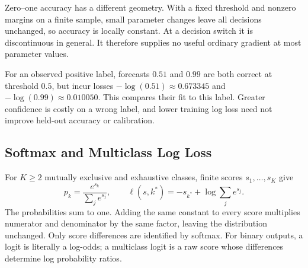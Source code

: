 Zero--one accuracy has a different geometry. With a fixed threshold and nonzero margins on a finite sample, small parameter changes leave all decisions unchanged, so accuracy is locally constant. At a decision switch it is discontinuous in general. It therefore supplies no useful ordinary gradient at most parameter values.

For an observed positive label, forecasts $0.51$ and $0.99$ are both correct at threshold $0.5$, but incur losses $-\log(0.51)\approx0.673345$ and $-\log(0.99)\approx0.010050$. This compares their fit to this label. Greater confidence is costly on a wrong label, and lower training log loss need not improve held-out accuracy or calibration.

\par\addvspace{\intextsep}\noindent\begin{minipage}{\linewidth}
\centering
{}
\label{fig:same-label-different-loss}
\end{minipage}\par\addvspace{\intextsep}

\subsection{Softmax and Multiclass Log Loss}

For $K\geq2$ mutually exclusive and exhaustive classes, finite scores $s_1,\ldots,s_K$ give
\[
p_k=\frac{e^{s_k}}{\sum_j e^{s_j}},
\qquad
\ell(s,k^*)=-s_{k^*}+\log\sum_j e^{s_j}.
\]
The probabilities sum to one. Adding the same constant to every score multiplies numerator and denominator by the same factor, leaving the distribution unchanged. Only score differences are identified by softmax. For binary outputs, a logit is literally a log-odds; a multiclass logit is a raw score whose differences determine log probability ratios.

